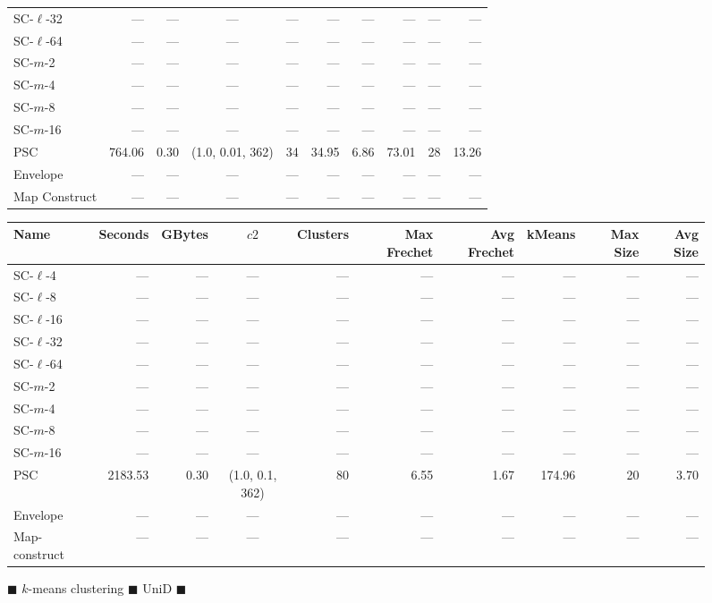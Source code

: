 \begin{figure}
\begin{center}
\begin{minipage}{\textwidth}
{\begin{tabular}{@{}lrrcrrrrrr@{}}
SC-$\ell$-32 & --- & --- & --- & --- & --- & --- & --- & --- & ---\\
SC-$\ell$-64 & --- & --- & --- & --- & --- & --- & --- & --- & ---\\
SC-$m$-2 & --- & --- & --- & --- & --- & --- & --- & --- & ---\\
SC-$m$-4 & --- & --- & --- & --- & --- & --- & --- & --- & ---\\
SC-$m$-8 & --- & --- & --- & --- & --- & --- & --- & --- & ---\\
SC-$m$-16 & --- & --- & --- & --- & --- & --- & --- & --- & ---\\
PSC & 764.06 & 0.30 & (1.0, 0.01, 362) & 34 & 34.95 & 6.86 & 73.01 & 28 & 13.26\\
Envelope & --- & --- & --- & --- & --- & --- & --- & --- & ---\\
Map Construct & --- & --- & --- & --- & --- & --- & --- & --- & ---\\
        \bottomrule
    \end{tabular}
    }
    {
    \begin{tabular}{@{}lrrcrrrrrr@{}}
        \toprule
        Name & Seconds & GBytes & $c2$ & Clusters & Max Frechet & Avg Frechet & kMeans & Max Size & Avg Size\\
        \midrule
        SC-$\ell$-4 & --- & --- & --- & --- & --- & --- & --- & --- & ---\\
SC-$\ell$-8 & --- & --- & --- & --- & --- & --- & --- & --- & ---\\
SC-$\ell$-16 & --- & --- & --- & --- & --- & --- & --- & --- & ---\\
SC-$\ell$-32 & --- & --- & --- & --- & --- & --- & --- & --- & ---\\
SC-$\ell$-64 & --- & --- & --- & --- & --- & --- & --- & --- & ---\\
SC-$m$-2 & --- & --- & --- & --- & --- & --- & --- & --- & ---\\
SC-$m$-4 & --- & --- & --- & --- & --- & --- & --- & --- & ---\\
SC-$m$-8 & --- & --- & --- & --- & --- & --- & --- & --- & ---\\
SC-$m$-16 & --- & --- & --- & --- & --- & --- & --- & --- & ---\\
PSC & 2183.53 & 0.30 & (1.0, 0.1, 362) & 80 & 6.55 & 1.67 & 174.96 & 20 & 3.70\\
Envelope & --- & --- & --- & --- & --- & --- & --- & --- & ---\\
Map-construct & --- & --- & --- & --- & --- & --- & --- & --- & ---\\
        \bottomrule
    \end{tabular}
    }
\end{minipage}
\end{center}
        \caption{$\blacksquare$ $k$-means clustering $\blacksquare$ UniD $\blacksquare$}
 \end{figure}
